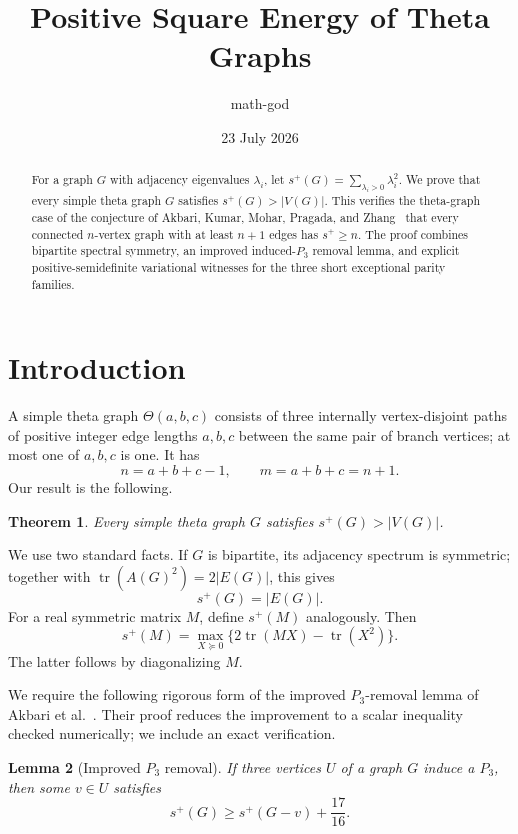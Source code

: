 \documentclass[11pt]{article}
\title{Positive Square Energy of Theta Graphs}
\author{math-god}
\date{23 July 2026}
\newtheorem{theorem}{Theorem}
\newtheorem{lemma}[theorem]{Lemma}
\begin{document}
\maketitle

\begin{abstract}
For a graph $G$ with adjacency eigenvalues $\lambda_i$, let
$s^+(G)=\sum_{\lambda_i>0}\lambda_i^2$.  We prove that every simple theta
graph $G$ satisfies
$s^+(G)>|V(G)|$.  This verifies the theta-graph case of the conjecture
of Akbari, Kumar, Mohar, Pragada, and Zhang~\cite{AKMPZ} that every connected $n$-vertex
graph with at least $n+1$ edges has $s^+\ge n$.  The proof combines bipartite
spectral symmetry, an improved induced-$P_3$ removal lemma, and explicit
positive-semidefinite variational witnesses for the three short exceptional
parity families.
\end{abstract}

\section{Introduction}
A simple theta graph $\Theta(a,b,c)$ consists of three internally
vertex-disjoint paths of positive integer edge lengths $a,b,c$ between the same pair of branch
vertices; at most one of $a,b,c$ is one.  It has
\[
 n=a+b+c-1,\qquad m=a+b+c=n+1.
\]
Our result is the following.

\begin{theorem}\label{thm:main}
Every simple theta graph $G$ satisfies $s^+(G)>|V(G)|$.
\end{theorem}

We use two standard facts.  If $G$ is bipartite, its adjacency spectrum is
symmetric; together with $\operatorname{tr}(A(G)^2)=2|E(G)|$, this gives
\begin{equation}\label{eq:bip}
 s^+(G)=|E(G)|.
\end{equation}
For a real symmetric matrix $M$, define $s^+(M)$ analogously.  Then
\begin{equation}\label{eq:var}
 s^+(M)=\max_{X\succeq0}\{2\operatorname{tr}(MX)-\operatorname{tr}(X^2)\}.
\end{equation}
The latter follows by diagonalizing $M$.

We require the following rigorous form of the improved $P_3$-removal lemma of
Akbari et al.~\cite[Lemma~2.4]{AKMPZ}.  Their proof reduces the improvement to a scalar inequality
checked numerically; we include an exact verification.

\begin{lemma}[Improved $P_3$ removal]\label{lem:p3}
If three vertices $U$ of a graph $G$ induce a $P_3$, then some $v\in U$
satisfies
\begin{equation}\label{eq:p3}
 s^+(G)\ge s^+(G-v)+\frac{17}{16}.
\end{equation}
\end{lemma}
\end{document}
